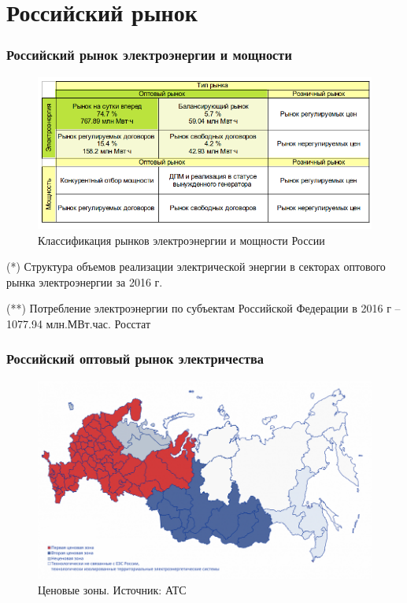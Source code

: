 \documentclass[c, dvipsnames]{beamer}  %
\begin{document}
\section{Российский рынок}

\begin{frame}[shrink=5]

\frametitle{Российский рынок электроэнергии и мощности} 
\begin{figure}
	\centering
	\includegraphics[width=0.9\linewidth]{screenshot023}
	\caption{Классификация рынков электроэнергии и мощности России}
	\label{fig:screenshot004}
\end{figure}


\footnotesize{(*) Структура объемов реализации электрической энергии в секторах оптового рынка электроэнергии за 2016 г. 


(**) Потребление электроэнергии по субъектам Российской Федерации в 2016 г --  1077.94 млн.МВт.час. Росстат
}




\end{frame}




\begin{frame}[shrink=5]
\frametitle{Российский оптовый рынок электричества} 
\begin{figure}
	\centering
	\includegraphics[width=1\linewidth]{screenshot014}
	\caption{ Ценовые зоны. Источник: АТС }
	\label{fig:screenshot013}
\end{figure}
\end{frame}
\end{document}
